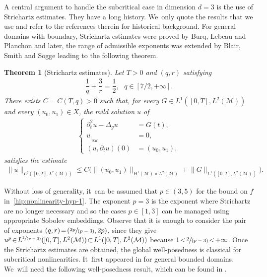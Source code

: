 \documentclass[JEP,XML,SOM,Unicode,published]{cedram}
\newcommand{\spfrac}[2]{\sfrac{#1}{(#2)}}
\newtheorem{theorem}{Theorem}[section]
\theoremstyle{definition}
\let\mc\mathcal
\newcommand{\M}{\mc{M}}
\providecommand{\norm}[1]{\lVert#1\rVert}
\begin{document}
A central argument to handle the subcritical case in dimension $d=3$ is the use of Strichartz estimates. They have a long history. We~only quote the results that we use and refer to the references therein for historical background. For general domains with boundary, Strichartz estimates were proved by Burq, Lebeau and Planchon \cite{BLP:08} and later, the range of admissible exponents was extended by Blair, Smith and Sogge \cite[Cor.\,1.2]{BSS:09} leading to the following theorem.

\begin{theorem}[Strichartz estimates]\label{thmStrichartz}
Let $T>0$ and $(q, r)$ satisfying
\begin{align}\label{thm:strichartz-exponents}
\dfrac{1}{q}+\dfrac{3}{r}=\dfrac{1}{2},\ \ \ q\in [7/2, +\infty].
\end{align}
There exists $C=C(T, q)>0$ such that, for every $G\in L^1([0, T], L^2(\M))$ and every $(u_0, u_1)\in X$, the mild solution $u$ of
\begin{align*}
\left\{\begin{array}{rl}
\partial_t^2 u-\Delta_g u&=G(t), \\[3pt]
u_{|_{\partial\M}}&=0, \\[3pt]
(u, \partial_t u)(0)&=(u_0, u_1),
\end{array}\right.
\end{align*}
satisfies the estimate
\begin{align*}
\norm{u}_{L^q([0, T], L^r(\M))}\leq C\big(\norm{(u_0, u_1)}_{H^1(\M)\times L^2(\M)}+\norm{G}_{L^1([0, T], L^2(\M))}\big).
\end{align*}
\end{theorem}

Without loss of generality, it~can be assumed that $p\in (3, 5)$ for the bound on $f$ in~\eqref{hip:nonlinearity-hyp-1}. The exponent $p=3$ is the exponent where Strichartz are no longer necessary and so the cases $p\in [1, 3]$ can be managed using appropriate Sobolev embeddings. Observe that it is enough to consider the pair of exponents $(q, r)\!=\!(\spfrac{2p}{p-3}, 2p)$, since they give $u^p\!\in\! L^{\spfrac{2}{p-3}}([0, T], L^2(\M))\!\subset\! L^1([0, T], L^2(\M))$ because \hbox{$1\!<\!\spfrac{2}{p-3}\!<\!+\infty$}. Once the Strichartz estimates are obtained, the global well-posedness is classical for subcritical nonlinearities. It~first appeared in \cite{BLP:08} for general bounded domains. We~will need the following well-posedness result, which can be found in \cite[Th.\,2.2]{JL13}.
\end{document}
